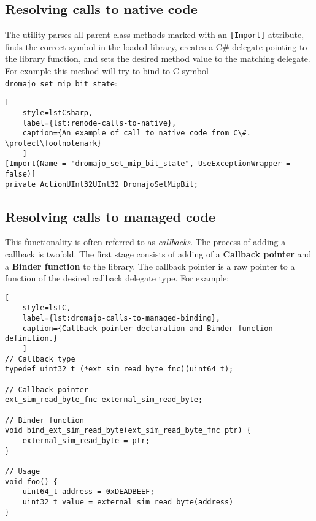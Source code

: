 \subsection*{Resolving calls to native code}

The utility parses all parent class methods marked with an \texttt{[Import]} attribute, finds the correct symbol in the
loaded library, creates a C\# delegate pointing to the library function, and sets the desired method value to the
matching delegate. For example this method will try to bind to C symbol \texttt{dromajo\_set\_mip\_bit\_state}:

\begin{lstlisting}[
    style=lstCsharp,
    label={lst:renode-calls-to-native},
    caption={An example of call to native code from C\#. \protect\footnotemark}
    ]
[Import(Name = "dromajo_set_mip_bit_state", UseExceptionWrapper = false)]
private ActionUInt32UInt32 DromajoSetMipBit;
\end{lstlisting}


\subsection*{Resolving calls to managed code}

This functionality is often referred to as \textit{callbacks}. The process of adding a callback is twofold. The first stage
consists of adding of a \textbf{Callback pointer} and a \textbf{Binder function} to the library. The callback pointer
is a raw pointer to a function of the desired callback delegate type. For example:

\begin{lstlisting}[
    style=lstC,
    label={lst:dromajo-calls-to-managed-binding},
    caption={Callback pointer declaration and Binder function definition.}
    ]
// Callback type
typedef uint32_t (*ext_sim_read_byte_fnc)(uint64_t);

// Callback pointer
ext_sim_read_byte_fnc external_sim_read_byte;

// Binder function
void bind_ext_sim_read_byte(ext_sim_read_byte_fnc ptr) {
    external_sim_read_byte = ptr;
}

// Usage
void foo() {
    uint64_t address = 0xDEADBEEF;
    uint32_t value = external_sim_read_byte(address)
}
\end{lstlisting}

